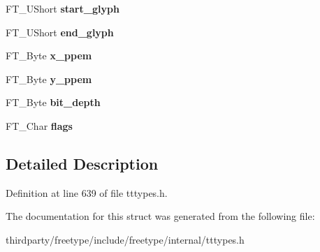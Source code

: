 \begin{DoxyCompactItemize}
F\+T\+\_\+\+U\+Short {\bfseries start\+\_\+glyph}
\item 
\mbox{\label{struct_t_t___s_bit___strike_rec___a1af21e0ef936193b22575ea75bad487f}} 
F\+T\+\_\+\+U\+Short {\bfseries end\+\_\+glyph}
\item 
\mbox{\label{struct_t_t___s_bit___strike_rec___a2a1b17c24df2084fe485aefe8f34e7d4}} 
F\+T\+\_\+\+Byte {\bfseries x\+\_\+ppem}
\item 
\mbox{\label{struct_t_t___s_bit___strike_rec___ad618814b841b86e7763f1aa371e04fed}} 
F\+T\+\_\+\+Byte {\bfseries y\+\_\+ppem}
\item 
\mbox{\label{struct_t_t___s_bit___strike_rec___ac57b360af4620bd06251d098f5da23bb}} 
F\+T\+\_\+\+Byte {\bfseries bit\+\_\+depth}
\item 
\mbox{\label{struct_t_t___s_bit___strike_rec___a38735f8c00b23deb25ffab798c0aa7b7}} 
F\+T\+\_\+\+Char {\bfseries flags}
\end{DoxyCompactItemize}


\subsection{Detailed Description}


Definition at line 639 of file tttypes.\+h.



The documentation for this struct was generated from the following file\+:\begin{DoxyCompactItemize}
\item 
thirdparty/freetype/include/freetype/internal/tttypes.\+h\end{DoxyCompactItemize}
